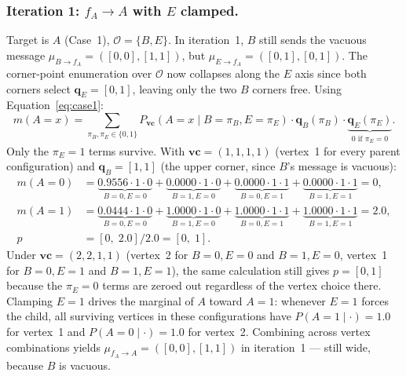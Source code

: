\documentclass[11pt]{article}
\begin{document}
\subsubsection{Iteration 1: $f_A \to A$ with $E$ clamped.}
Target is $A$ (Case~1), $\mathcal{O} = \{B, E\}$. In iteration~1, $B$ still
sends the vacuous message $\mu_{B \to f_A} = ([0,0],[1,1])$, but
$\mu_{E \to f_A} = ([0,1], [0,1])$. The corner-point enumeration over
$\mathcal{O}$ now collapses along the $E$ axis since both corners select
$\mathbf{q}_E = [0, 1]$, leaving only the two $B$ corners free. Using
Equation~\ref{eq:case1}:
\[
  m(A{=}x) = \sum_{\pi_B, \pi_E \in \{0,1\}}
             P_{\mathbf{vc}}(A{=}x \mid B{=}\pi_B, E{=}\pi_E) \cdot
             \mathbf{q}_B(\pi_B) \cdot \underbrace{\mathbf{q}_E(\pi_E)}_{0 \text{ if } \pi_E = 0}.
\]
Only the $\pi_E = 1$ terms survive. With $\mathbf{vc} = (1,1,1,1)$ (vertex~1
for every parent configuration) and $\mathbf{q}_B = [1, 1]$ (the upper corner,
since $B$'s message is vacuous):
\begin{align*}
  m(A{=}0) &= \underbrace{0.9556 \cdot 1 \cdot 0}_{B{=}0,E{=}0}
           + \underbrace{0.0000 \cdot 1 \cdot 0}_{B{=}1,E{=}0}
           + \underbrace{0.0000 \cdot 1 \cdot 1}_{B{=}0,E{=}1}
           + \underbrace{0.0000 \cdot 1 \cdot 1}_{B{=}1,E{=}1} = 0, \\
  m(A{=}1) &= \underbrace{0.0444 \cdot 1 \cdot 0}_{B{=}0,E{=}0}
           + \underbrace{1.0000 \cdot 1 \cdot 0}_{B{=}1,E{=}0}
           + \underbrace{1.0000 \cdot 1 \cdot 1}_{B{=}0,E{=}1}
           + \underbrace{1.0000 \cdot 1 \cdot 1}_{B{=}1,E{=}1} = 2.0, \\
  p &= [0,\; 2.0]/2.0 = [0,\; 1].
\end{align*}
Under $\mathbf{vc} = (2,2,1,1)$ (vertex~2 for $B{=}0,E{=}0$ and $B{=}1,E{=}0$,
vertex~1 for $B{=}0,E{=}1$ and $B{=}1,E{=}1$), the same calculation still gives
$p = [0, 1]$ because the $\pi_E = 0$ terms are zeroed out regardless of the
vertex choice there. Clamping $E{=}1$ drives the marginal of $A$ toward
$A{=}1$: whenever $E{=}1$ forces the child, all surviving vertices in these
configurations have $P(A{=}1 \mid \cdot) = 1.0$ for vertex~1 and $P(A{=}0 \mid
\cdot) = 1.0$ for vertex~2. Combining across vertex combinations yields
$\mu_{f_A \to A} = ([0, 0], [1, 1])$ in iteration~1 --- still wide, because
$B$ is vacuous.
\end{document}
